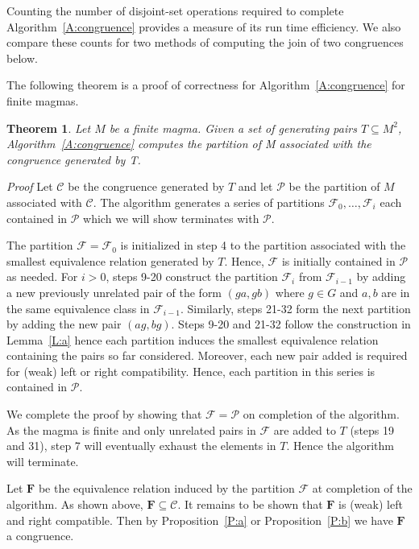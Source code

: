 \documentclass{acmconf}
\newtheorem{theorem}{Theorem}
\begin{document}
Counting the number of disjoint-set operations required 
to complete Algorithm~\ref{A:congruence}
provides a measure of its run time efficiency. 
We also compare these counts for two methods of  
computing the join of two congruences below.

The following theorem is a proof of correctness for 
Algorithm~\ref{A:congruence} for finite magmas.

\begin{theorem} \label {T:a}
Let $M$ be a finite magma. Given a set of generating pairs $T\subseteq M^2$,
Algorithm~\ref{A:congruence} computes
the partition of M associated with the congruence generated by T.
\end{theorem}

\emph{Proof}
Let $\mathcal C$ be the congruence generated by $T$ and let
$\mathcal P$ be the partition of $M$ associated with $\mathcal C$.
The algorithm generates a series of partitions
$\mathcal F_0,\dots,\mathcal F_i$ each contained in $\mathcal P$
which we will show terminates with $\mathcal P$. 

The partition $\mathcal F=\mathcal F_0$ is initialized in
step 4 to the partition
associated with the smallest equivalence relation generated by $T$. 
Hence, $\mathcal F$ is initially contained in $\mathcal P$ as needed.
For $i>0$, steps 9-20 construct 
the partition $\mathcal F_i$ 
from $\mathcal F_{i-1}$ by adding 
a new previously unrelated pair of the form
$(ga,gb)$ where $g\in G$ and $a,b$ are in the same equivalence class
in $\mathcal F_{i-1}$. Similarly, steps 21-32 form the next partition
by adding the new pair $(ag,bg)$. Steps 9-20 and 21-32 follow the 
construction in Lemma~\ref{L:a} hence each partition induces the 
smallest equivalence relation containing the pairs so far considered.
Moreover, each new pair added is required for (weak) left or right 
compatibility. Hence, each partition in this series is contained in 
$\mathcal P$.

We complete the proof by showing that $\mathcal F = \mathcal P$ 
on completion of the algorithm. As the magma is finite and only
unrelated pairs in $\mathcal F$ are added to $T$ (steps 19 and 31), 
step 7 will eventually exhaust the
elements in $T$. Hence the algorithm will terminate.

Let $\mathbf F$ be the equivalence
relation induced by the partition $\mathcal F$ at completion of 
the algorithm. As shown above, $\mathbf F\subseteq\mathcal C$.
It remains to be shown that $\mathbf F$ is (weak) left and right
compatible. Then by Proposition~\ref{P:a} or Proposition~\ref{P:b}
we have $\mathbf F$ a congruence.
\end{document}
